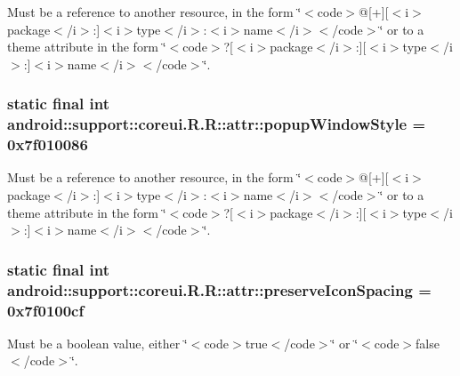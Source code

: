 Must be a reference to another resource, in the form \char`\"{}$<$code$>$@\mbox{[}+\mbox{]}\mbox{[}$<$i$>$package$<$/i$>$:\mbox{]}$<$i$>$type$<$/i$>$:$<$i$>$name$<$/i$>$$<$/code$>$\char`\"{} or to a theme attribute in the form \char`\"{}$<$code$>$?\mbox{[}$<$i$>$package$<$/i$>$:\mbox{]}\mbox{[}$<$i$>$type$<$/i$>$:\mbox{]}$<$i$>$name$<$/i$>$$<$/code$>$\char`\"{}. \hypertarget{classandroid_1_1support_1_1coreui_1_1_r_1_1attr_88c00b3f40350f302ca39a4b77fea868}{
\subsubsection[{popupWindowStyle}]{\setlength{\rightskip}{0pt plus 5cm}static final int android::support::coreui.R.R::attr::popupWindowStyle = 0x7f010086}}
\label{classandroid_1_1support_1_1coreui_1_1_r_1_1attr_88c00b3f40350f302ca39a4b77fea868}


Must be a reference to another resource, in the form \char`\"{}$<$code$>$@\mbox{[}+\mbox{]}\mbox{[}$<$i$>$package$<$/i$>$:\mbox{]}$<$i$>$type$<$/i$>$:$<$i$>$name$<$/i$>$$<$/code$>$\char`\"{} or to a theme attribute in the form \char`\"{}$<$code$>$?\mbox{[}$<$i$>$package$<$/i$>$:\mbox{]}\mbox{[}$<$i$>$type$<$/i$>$:\mbox{]}$<$i$>$name$<$/i$>$$<$/code$>$\char`\"{}. \hypertarget{classandroid_1_1support_1_1coreui_1_1_r_1_1attr_d2a376156fbfb0cb65091042ff9717ba}{
\subsubsection[{preserveIconSpacing}]{\setlength{\rightskip}{0pt plus 5cm}static final int android::support::coreui.R.R::attr::preserveIconSpacing = 0x7f0100cf}}
\label{classandroid_1_1support_1_1coreui_1_1_r_1_1attr_d2a376156fbfb0cb65091042ff9717ba}


Must be a boolean value, either \char`\"{}$<$code$>$true$<$/code$>$\char`\"{} or \char`\"{}$<$code$>$false$<$/code$>$\char`\"{}. 

